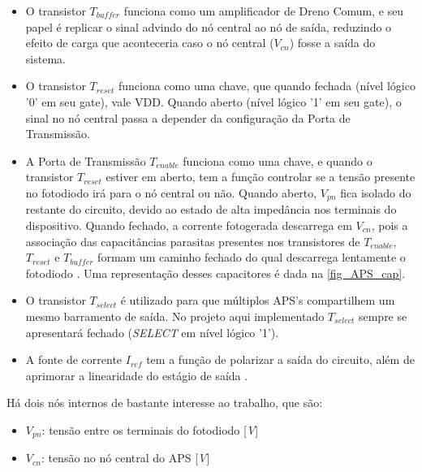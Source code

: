 \begin{itemize}

    \item O transistor $T_{buffer}$ funciona como um amplificador de Dreno Comum, e seu papel \'e replicar o sinal advindo do n\'o central ao n\'o de sa\'ida, reduzindo o efeito de carga que aconteceria caso o n\'o central ($V_{cn}$) fosse a saída do sistema.

    \item O transistor $T_{reset}$ funciona como uma chave, que quando fechada (nível lógico '0' em seu gate), vale VDD. Quando aberto (nível lógico '1' em seu gate), o sinal no n\'o central passa a depender da configuração da Porta de Transmissão.

    \item A Porta de Transmissão $T_{enable}$ funciona como uma chave, e quando o transistor $T_{reset}$ estiver em aberto, tem a função controlar se a tensão presente no fotodiodo ir\'a para o nó central ou não. Quando aberto, $V_{pn}$ fica isolado do restante do circuito, devido ao estado de alta imped\^ancia nos terminais do dispositivo. Quando fechado, a corrente fotogerada descarrega em $V_{cn}$, pois a associação das capacitâncias parasitas presentes nos transistores de $T_{enable}$, $T_{reset}$ e $T_{buffer}$ formam um caminho fechado do qual descarrega lentamente o fotodiodo \cite{LidianeCampos}. Uma representação desses capacitores \'e dada na \autoref{fig_APS_cap}.
    
    \item O transistor $T_{select}$ \'e utilizado para que m\'ultiplos APS's compartilhem um mesmo barramento de sa\'ida. No projeto aqui implementado $T_{select}$ sempre se apresentar\'a fechado (\textit{SELECT} em n\'ivel l\'ogico '1').
    
    \item A fonte de corrente \textit{$I_{ref}$} tem a função de polarizar a sa\'ida do circuito, além de aprimorar a linearidade do estágio de sa\'ida \cite{RazaviFundM}.

\end{itemize}

    H\'a dois n\'os internos de bastante interesse ao trabalho, que são:

\begin{itemize}
    \item \textit{$V_{pn}$}: tensão entre os terminais do fotodiodo [\textit{V}]
    \item \textit{$V_{cn}$}: tensão no n\'o central do APS [\textit{V}]
\end{itemize}

